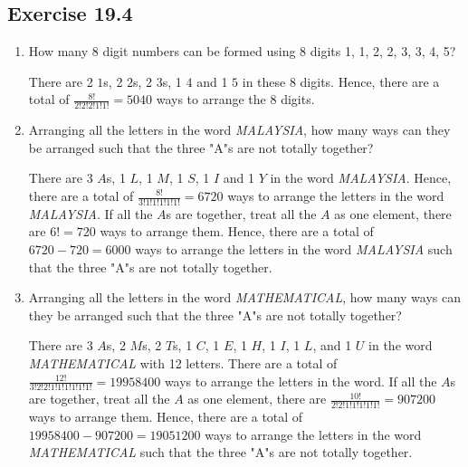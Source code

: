 \documentclass{report}
\begin{document}
\begin{multicols}{2}
  \subsection{Exercise 19.4}

  \begin{enumerate}
    \item How many 8 digit numbers can be formed using 8 digits 1, 1, 2, 2, 3, 3, 4, 5?
          \sol{}

          There are 2 $1$s, 2 $2$s, 2 $3$s, 1 $4$ and 1 $5$ in these 8 digits. Hence,
          there are a total of $\frac{8!}{2!2!2!1!1!} = 5040$ ways to arrange the 8
          digits.

    \item Arranging all the letters in the word \textit{MALAYSIA}, how many ways can they
          be arranged such that the three "A"s are not totally together? \sol{}

          There are 3 $A$s, 1 $L$, 1 $M$, 1 $S$, 1 $I$ and 1 $Y$ in the word
          \textit{MALAYSIA}. Hence, there are a total of $\frac{8!}{3!1!1!1!1!1!} = 6720$
          ways to arrange the letters in the word \textit{MALAYSIA}. If all the $A$s are
          together, treat all the $A$ as one element, there are $6! = 720$ ways to
          arrange them. Hence, there are a total of $6720 - 720 = 6000$ ways to arrange
          the letters in the word \textit{MALAYSIA} such that the three "A"s are not
          totally together.

    \item Arranging all the letters in the word \textit{MATHEMATICAL}, how many ways can
          they be arranged such that the three "A"s are not totally together? \sol{}

          There are 3 $A$s, 2 $M$s, 2 $T$s, 1 $C$, 1 $E$, 1 $H$, 1 $I$, 1 $L$, and 1 $U$
          in the word \textit{MATHEMATICAL} with 12 letters. There are a total of
          $\frac{12!}{3!2!2!1!1!1!1!1!1!} = 19958400$ ways to arrange the letters in the
          word. If all the $A$s are together, treat all the $A$ as one element, there are
          $\frac{10!}{2!2!1!1!1!1!1!} = 907200$ ways to arrange them. Hence, there are a
          total of $19958400 - 907200 = 19051200$ ways to arrange the letters in the word
          \textit{MATHEMATICAL} such that the three "A"s are not totally together.


\end{enumerate}
\end{multicols}
\end{document}
